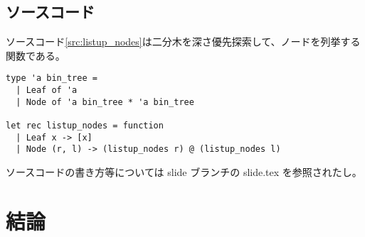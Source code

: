 \documentclass[sharedthmnum]{sumiilab-paper}
\begin{document}
\section{ソースコード}

ソースコード\ref{src:listup_nodes}は二分木を深さ優先探索して、ノードを列挙する関数である。
\begin{lstlisting}[caption=二分木のノードのリストアップ,label=src:listup_nodes]
type 'a bin_tree =
  | Leaf of 'a
  | Node of 'a bin_tree * 'a bin_tree

let rec listup_nodes = function
  | Leaf x -> [x]
  | Node (r, l) -> (listup_nodes r) @ (listup_nodes l)
\end{lstlisting}
ソースコードの書き方等については slide ブランチの slide.tex を参照されたし。

\chapter{結論}



\end{document}
